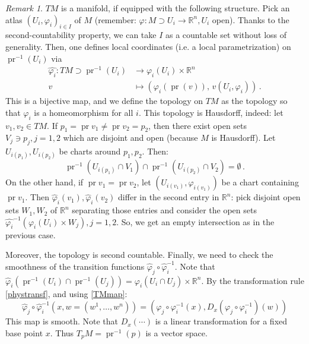 \documentclass[a4paper,11pt,titlepage, article, oneside]{memoir}
\numberwithin{equation}{section}
\theoremstyle{definition}
\theoremstyle{remark}
\newtheorem{remark}[theorem]{Remark}
\DeclareMathOperator{\pr}{pr}
\newcommand{\rfield}{\mathbb{R}}
\begin{document}
\begin{remarkbox}\begin{remark}
$TM$ is a manifold, if equipped with the following structure. Pick an atlas $(U_i, \varphi_i)_{i \in I}$ of $M$ (remember: $\varphi \colon M \supset U_i \rightarrow \rfield^n, U_i$ open). Thanks to the second-countability property, we can take $I$ as a countable set without loss of generality. Then, one defines local coordinates (i.e. a local parametrization) on $\pr^{-1}(U_i)$ via
\begin{align} \label{TMmap}
\hat{\varphi_i} \colon TM \supset \pr^{-1}(U_i) &\longrightarrow \varphi_i(U_i) \times \rfield^n \\
v &\longmapsto \left ( \varphi_i(\pr(v)),\, v(U_i, \varphi_i) \right ) \, . \nonumber
\end{align}
This is a bijective map, and we define the topology on $TM$ as the topology so that $\hat{\varphi_i}$ is a homeomorphism for all $i$. This topology is Hausdorff, indeed: let $v_1, v_2 \in TM$. If $p_1 = \pr v_1 \not = \pr v_2 = p_2$, then there exist open sets $V_j \ni p_j, j =1, 2$ which are disjoint and open (because $M$ is Hausdorff). Let $U_{i(p_1)}, U_{i(p_2)}$ be charts around $p_1, p_2$. Then:
\[ \pr^{-1} \left( U_{i(p_1)} \cap V_1 \right) \cap \pr^{-1} \left( U_{i(p_2)} \cap V_2 \right) = \emptyset \, . \]
On the other hand, if $\pr v_1 = \pr v_2$, let $\left( U_{i(v_1)}, \varphi_{i(v_1)} \right)$ be a chart containing $\pr v_1$. Then $\hat \varphi_i(v_1), \hat \varphi_i (v_2)$ differ in the second entry in $\rfield^n$: pick disjoint open sets $W_1, W_2$ of $\rfield^n$ separating those entries and consider the open sets $\hat{\varphi_i}^{-1} \left( \varphi_i(U_i) \times W_j \right), j =1, 2$. So, we get an empty intersection as in the previous case.

Moreover, the topology is second countable. Finally, we need to check the smoothness of the transition functions $\hat \varphi_j \circ \hat \varphi_i^{-1}$. Note that $\hat \varphi_i \left( \pr^{-1}(U_i) \cap \pr^{-1}(U_j) \right) = \varphi_i (U_i \cap U_j) \times \rfield^n$. By the transformation rule \eqref{phystransf}, and using \eqref{TMmap}:
$$\hat \varphi_j \circ \hat \varphi_i^{-1} \left (x, w = (w^1, \ldots, w^n) \right) = (\varphi_j \circ \varphi_i^{-1}(x), D_x(\varphi_j \circ \varphi_i^{-1}) (w))$$
This map is smooth. Note that $D_x(\cdots)$ is a linear transformation for a fixed base point $x$.
Thus $ T_pM = \pr^{-1}(p)$ is a vector space.
\end{remark}\end{remarkbox}
\end{document}
